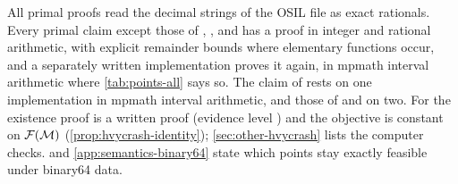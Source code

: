 All primal proofs read the decimal strings of the OSIL file as exact rationals.
Every primal claim except those of , ,  and  has a proof in integer and rational arithmetic, with explicit remainder bounds where elementary functions occur, and a separately written implementation proves it again, in mpmath interval arithmetic where \cref{tab:points-all} says so.
The claim of  rests on one implementation in mpmath interval arithmetic, and those of  and  on two.
For  the existence proof is a written proof (evidence level ) and the objective is constant on $\mathcal{F}(\mathcal{M})$ (\cref{prop:hvycrash-identity}); \cref{sec:other-hvycrash} lists the computer checks.
 and \cref{app:semantics-binary64} state which points stay exactly feasible under binary64 data.
